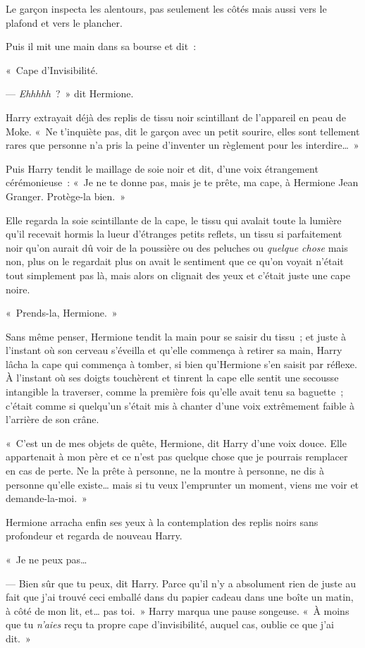 Le garçon inspecta les alentours, pas seulement les côtés mais aussi vers le plafond et vers le plancher.

Puis il mit une main dans sa bourse et dit~:

«~Cape d'Invisibilité.

--- \emph{Ehhhhh}~?~»
dit Hermione.

Harry extrayait déjà des replis de tissu noir scintillant de l'appareil en peau de Moke.
«~Ne t'inquiète pas, dit le garçon avec un petit sourire, elles sont tellement rares que personne n'a pris la peine d'inventer un règlement pour les interdire…~»

Puis Harry tendit le maillage de soie noir et dit, d'une voix étrangement cérémonieuse~: «~Je ne te donne pas, mais je te prête, ma cape, à Hermione Jean Granger.
Protège-la bien.~»

Elle regarda la soie scintillante de la cape, le tissu qui avalait toute la lumière qu'il recevait hormis la lueur d'étranges petits reflets, un tissu si parfaitement noir qu'on aurait dû voir de la poussière ou des peluches ou \emph{quelque chose} mais non, plus on le regardait plus on avait le sentiment que ce qu'on voyait n'était tout simplement pas là, mais alors on clignait des yeux et c'était juste une cape noire.

«~Prends-la, Hermione.~»

Sans même penser, Hermione tendit la main pour se saisir du tissu~; et juste à l'instant où son cerveau s'éveilla et qu'elle commença à retirer sa main, Harry lâcha la cape qui commença à tomber, si bien qu'Hermione s'en saisit par réflexe.
À l'instant où ses doigts touchèrent et tinrent la cape elle sentit une secousse intangible la traverser, comme la première fois qu'elle avait tenu sa baguette~; c'était comme si quelqu'un s'était mis à chanter d'une voix extrêmement faible à l'arrière de son crâne.

«~C'est un de mes objets de quête, Hermione, dit Harry d'une voix douce.
Elle appartenait à mon père et ce n'est pas quelque chose que je pourrais remplacer en cas de perte.
Ne la prête à personne, ne la montre à personne, ne dis à personne qu'elle existe… mais si tu veux l'emprunter un moment, viens me voir et demande-la-moi.~»

Hermione arracha enfin ses yeux à la contemplation des replis noirs sans profondeur et regarda de nouveau Harry.

«~Je ne peux pas…

--- Bien sûr que tu peux, dit Harry.
Parce qu'il n'y a absolument rien de juste au fait que j'ai trouvé ceci emballé dans du papier cadeau dans une boîte un matin, à côté de mon lit, et… pas toi.~»
Harry marqua une pause songeuse.
«~À moins que tu \emph{n'aies} reçu ta propre cape d'invisibilité, auquel cas, oublie ce que j'ai dit.~»

